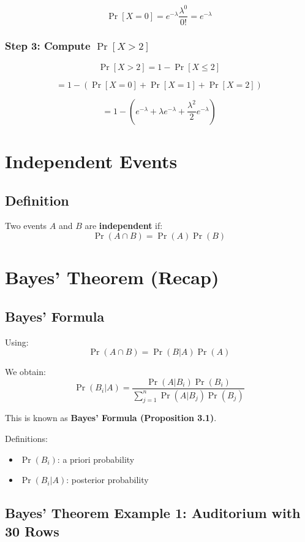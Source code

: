 \documentclass[11pt]{article}
\begin{document}
\[
\Pr[X=0] = e^{-\lambda} \frac{\lambda^0}{0!} = e^{-\lambda}
\]

\subsubsection*{Step 3: Compute $\Pr[X > 2]$}

\[
\Pr[X>2] = 1 - \Pr[X \le 2]
\]

\[
= 1 - \left( \Pr[X=0] + \Pr[X=1] + \Pr[X=2] \right)
\]

\[
= 1 - \left( e^{-\lambda} + \lambda e^{-\lambda} + \frac{\lambda^2}{2} e^{-\lambda} \right)
\]

\section{Independent Events}

\subsection{Definition}

Two events $A$ and $B$ are \textbf{independent} if:
\[
\Pr(A \cap B) = \Pr(A)\Pr(B)
\]

\section{Bayes’ Theorem (Recap)}

\subsection{Bayes’ Formula}

Using:
\[
\Pr(A \cap B) = \Pr(B|A)\Pr(A)
\]

We obtain:
\[
\Pr(B_i|A) = \frac{\Pr(A|B_i)\Pr(B_i)}{\sum_{j=1}^{n} \Pr(A|B_j)\Pr(B_j)}
\]

This is known as \textbf{Bayes’ Formula (Proposition 3.1)}.

Definitions:
\begin{itemize}
    \item $\Pr(B_i)$: a priori probability
    \item $\Pr(B_i|A)$: posterior probability
\end{itemize}

\subsection{Bayes’ Theorem Example 1: Auditorium with 30 Rows}
\end{document}
